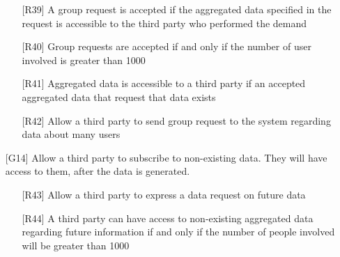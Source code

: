 \begin{itemize}
\begin{itemize}
	\item[{[R39]}] A group request is accepted if the aggregated data specified in the request is accessible to the third party who performed the demand
	\item[{[R40]}] Group requests are accepted if and only if the number of user involved is greater than 1000
	\item[{[R41]}] Aggregated data is accessible to a third party if an accepted aggregated data that request that data exists
	\item[{[R42]}] Allow a third party to send group request to the system regarding data about many users
	\end{itemize}
\item[{[G14]}] Allow a third party to subscribe to non-existing data. They will have access to them, after the data is generated. 
	\begin{itemize}
	\item[{[R43]}] Allow a third party to express a data request on future data
	\item[{[R44]}] A third party can have access to non-existing aggregated data regarding future information if and only if the number of people involved will be greater than 1000
	\end{itemize}
\end{itemize}



